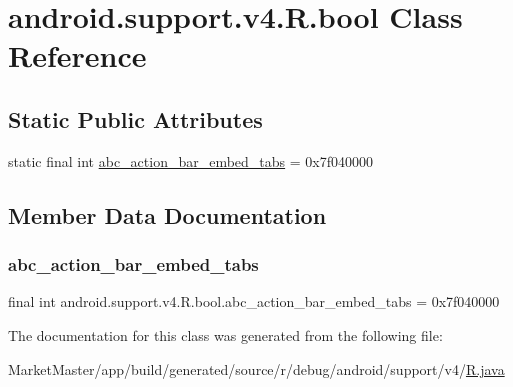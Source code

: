 \hypertarget{classandroid_1_1support_1_1v4_1_1R_1_1bool}{}\section{android.\+support.\+v4.\+R.\+bool Class Reference}
\label{classandroid_1_1support_1_1v4_1_1R_1_1bool}
\subsection*{Static Public Attributes}
\begin{DoxyCompactItemize}
\item 
static final int \mbox{\hyperlink{classandroid_1_1support_1_1v4_1_1R_1_1bool_ae48329695247e01d9540cb1c14ff19b0}{abc\+\_\+action\+\_\+bar\+\_\+embed\+\_\+tabs}} = 0x7f040000
\end{DoxyCompactItemize}


\subsection{Member Data Documentation}
\mbox{\label{classandroid_1_1support_1_1v4_1_1R_1_1bool_ae48329695247e01d9540cb1c14ff19b0}} 
\subsubsection{\texorpdfstring{abc\+\_\+action\+\_\+bar\+\_\+embed\+\_\+tabs}{abc\_action\_bar\_embed\_tabs}}
{\footnotesize\ttfamily final int android.\+support.\+v4.\+R.\+bool.\+abc\+\_\+action\+\_\+bar\+\_\+embed\+\_\+tabs = 0x7f040000\hspace{0.3cm}{\ttfamily [static]}}



The documentation for this class was generated from the following file\+:\begin{DoxyCompactItemize}
\item 
Market\+Master/app/build/generated/source/r/debug/android/support/v4/\mbox{\hyperlink{debug_2android_2support_2v4_2R_8java}{R.\+java}}\end{DoxyCompactItemize}
